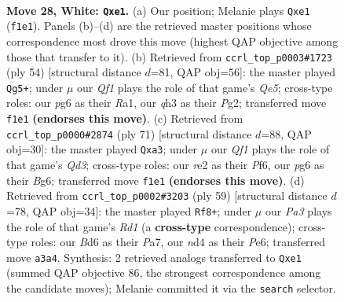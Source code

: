 \documentclass[11pt]{article}
\begin{document}
\clearpage

\begin{figure}[p]\centering
\begin{subfigure}{0.46\textwidth}\centering
\resizebox{\linewidth}{!}{%
\newchessgame
\chessboard[
  setfen={6k1/p4p1p/3B2p1/8/3n1P2/P6q/4r3/R3rQK1 w - - 1 28},
  showmover=false,
  pgfstyle=straightmove, color=movearrow, markmove={f1-e1}
]}
\caption{}
\end{subfigure}\hfill
\begin{subfigure}{0.46\textwidth}\centering
\resizebox{\linewidth}{!}{%
\newchessgame
\chessboard[
  setfen={6k1/5p1p/3qp3/4Q3/r2r4/7P/5PP1/R2R2K1 w - - 1 28},
  showmover=false,
  pgfstyle=straightmove, color=movearrow, markmove={e5-g5}
]}
\caption{}
\end{subfigure}
\\[4pt]
\begin{subfigure}{0.46\textwidth}\centering
\resizebox{\linewidth}{!}{%
\newchessgame
\chessboard[
  setfen={5k2/5p1p/3q1pb1/4r3/8/Q3R2P/5PP1/5BK1 b - - 4 36},
  showmover=false,
  pgfstyle=straightmove, color=movearrow, markmove={d6-a3}
]}
\caption{}
\end{subfigure}\hfill
\begin{subfigure}{0.46\textwidth}\centering
\resizebox{\linewidth}{!}{%
\newchessgame
\chessboard[
  setfen={1k1r4/p7/4p2r/1Bq1P1p1/8/4Q3/1P3KP1/R2R4 b - - 1 30},
  showmover=false,
  pgfstyle=straightmove, color=movearrow, markmove={d8-f8}
]}
\caption{}
\end{subfigure}
\caption{\textbf{Move 28, White: \texttt{Qxe1}.} (a) Our position; Melanie plays \texttt{Qxe1} (\texttt{f1e1}). Panels (b)--(d) are the retrieved master positions whose correspondence most drove this move (highest QAP objective among those that transfer to it). (b) Retrieved from \texttt{ccrl\_top\_p0003\#1723} (ply 54) [structural distance $d$=81, QAP obj=56]: the master played \texttt{Qg5+}; under $\mu$ our \emph{Qf1} plays the role of that game's \emph{Qe5}; cross-type roles: our \emph{p}g6 as their \emph{R}a1, our \emph{q}h3 as their \emph{P}g2; transferred move \texttt{f1e1} \textbf{(endorses this move)}. (c) Retrieved from \texttt{ccrl\_top\_p0000\#2874} (ply 71) [structural distance $d$=88, QAP obj=30]: the master played \texttt{Qxa3}; under $\mu$ our \emph{Qf1} plays the role of that game's \emph{Qd3}; cross-type roles: our \emph{r}e2 as their \emph{P}f6, our \emph{p}g6 as their \emph{B}g6; transferred move \texttt{f1e1} \textbf{(endorses this move)}. (d) Retrieved from \texttt{ccrl\_top\_p0002\#3203} (ply 59) [structural distance $d$=78, QAP obj=34]: the master played \texttt{Rf8+}; under $\mu$ our \emph{Pa3} plays the role of that game's \emph{Rd1} (a \textbf{cross-type} correspondence); cross-type roles: our \emph{B}d6 as their \emph{P}a7, our \emph{n}d4 as their \emph{P}e6; transferred move \texttt{a3a4}. Synthesis: 2 retrieved analogs transferred to \texttt{Qxe1} (summed QAP objective 86, the strongest correspondence among the candidate moves); Melanie committed it via the \texttt{search} selector.}
\label{fig:thought-m54}
\end{figure}
\end{document}
